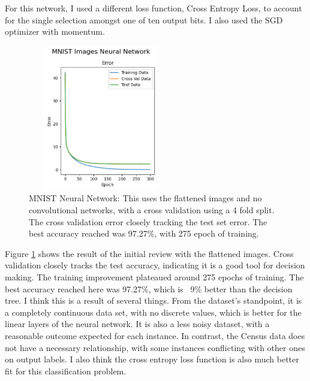 \documentclass[letterpaper]{article} %
\begin{document}
For this network, I used a different loss function, Cross Entropy Loss, to account for the single selection amongst one of ten output bits.  I also used the SGD optimizer with momentum. 

\begin{figure}[h]
\centering
\includegraphics[width=2.5in, height=2.5in]{figures/MNIST_Images_Neural_Network_Error_MNIST.png}
\caption{MNIST Neural Network:  This uses the flattened images and no convolutional networks, with a cross validation using a 4 fold split.  The cross validation error closely tracking the test set error. The best accuracy reached was 97.27\%,  with 275 epoch of training.  }
\label{fig:MNIST_Error_neural_network}
\end{figure}

Figure \ref{fig:MNIST_Error_neural_network} shows the result of the initial review with the flattened images.  Cross validation closely tracks the test accuracy, indicating it is a good tool for decision making.  The training improvement plateaued around 275 epochs of training.  The best accuracy reached here was 97.27\%, which is ~9\% better than the decision tree.  I think this is a result of several things.  From the dataset's standpoint, it is a completely continuous data set, with no discrete values, which is better for the linear layers of the neural network.  It is also a less noisy dataset, with a reasonable outcome expected for each instance.  In contrast, the Census data does not have a necessary relationship, with some instances conflicting with other ones on output labels.  I also think the cross entropy loss function is also much better fit for this classification problem.
\end{document}
